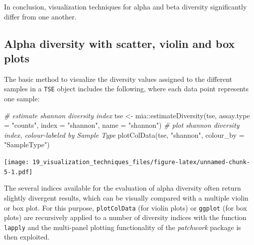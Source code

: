 \documentclass[
]{book}
\newenvironment{Shaded}{\begin{snugshade}}{\end{snugshade}}
\newcommand{\AttributeTok}[1]{\textcolor[rgb]{0.77,0.63,0.00}{#1}}
\newcommand{\CommentTok}[1]{\textcolor[rgb]{0.56,0.35,0.01}{\textit{#1}}}
\newcommand{\FunctionTok}[1]{\textcolor[rgb]{0.00,0.00,0.00}{#1}}
\newcommand{\NormalTok}[1]{#1}
\newcommand{\OtherTok}[1]{\textcolor[rgb]{0.56,0.35,0.01}{#1}}
\newcommand{\SpecialCharTok}[1]{\textcolor[rgb]{0.00,0.00,0.00}{#1}}
\newcommand{\StringTok}[1]{\textcolor[rgb]{0.31,0.60,0.02}{#1}}
\begin{document}
In conclusion, visualization techniques for alpha and beta diversity
significantly differ from one another.

\hypertarget{alpha-diversity-with-scatter-violin-and-box-plots}{%
\subsection{Alpha diversity with scatter, violin and box plots}\label{alpha-diversity-with-scatter-violin-and-box-plots}}

The basic method to visualize the diversity values assigned to the
different samples in a \texttt{TSE} object includes the following, where each
data point represents one sample:

\begin{Shaded}
\begin{Highlighting}[]
\CommentTok{\# estimate shannon diversity index}
\NormalTok{tse }\OtherTok{\textless{}{-}}\NormalTok{ mia}\SpecialCharTok{::}\FunctionTok{estimateDiversity}\NormalTok{(tse, }
                              \AttributeTok{assay.type =} \StringTok{"counts"}\NormalTok{,}
                              \AttributeTok{index =} \StringTok{"shannon"}\NormalTok{, }
                              \AttributeTok{name =} \StringTok{"shannon"}\NormalTok{)}
\CommentTok{\# plot shannon diversity index, colour{-}labeled by Sample Type}
\FunctionTok{plotColData}\NormalTok{(tse, }\StringTok{"shannon"}\NormalTok{, }\AttributeTok{colour\_by =} \StringTok{"SampleType"}\NormalTok{)}
\end{Highlighting}
\end{Shaded}

\texttt{[image: 19\_visualization\_techniques\_files/figure-latex/unnamed-chunk-5-1.pdf]}

The several indices available for the evaluation of alpha diversity
often return slightly divergent results, which can be visually
compared with a multiple violin or box plot. For this purpose,
\texttt{plotColData} (for violin plots) or \texttt{ggplot} (for box plots) are
recursively applied to a number of diversity indices with the function
\texttt{lapply} and the multi-panel plotting functionality of the \emph{patchwork}
package is then exploited.
\end{document}

